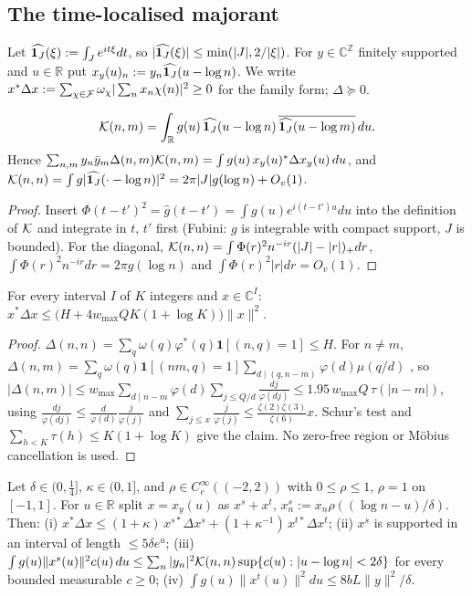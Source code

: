 \subsection{The time-localised majorant}\label{ssec:majorant}

Let $\widehat{\mathbf 1_J}(\xi):=\int_Je^{it\xi}dt$, so $|\widehat{\mathbf 1_J}(\xi)|\le\min(|J|,2/|\xi|)$. For $y\in\mathbb C^{\mathbb Z}$ finitely supported and $u\in\mathbb R$ put
$x_y(u)_n:=y_n\widehat{\mathbf 1_J}(u-\log n)$. We write $x^*\Delta x:=\sum_{\chi\in\mathcal{F}}\omega_\chi|\sum_nx_n\chi(n)|^2\ge0$ for the family form; $\Delta\succeq0$.

\begin{lemma}\label{lem:M1}
\[
 \mathcal{K}(n,m)=\int_{\mathbb R}g(u)\,\widehat{\mathbf 1_J}(u-\log n)\,\overline{\widehat{\mathbf 1_J}(u-\log m)}\,du .
\]
Hence
$\sum_{n,m}y_n\bar y_m\Delta(n,m)\mathcal{K}(n,m)=\int g(u)\,x_y(u)^*\Delta x_y(u)\,du$, and $\mathcal{K}(n,n)=\int g|\widehat{\mathbf 1_J}(\cdot-\log n)|^2=2\pi|J|g(\log n)+O_v(1)$.
\end{lemma}

\begin{proof}
Insert $\Phi(t-t')^2=\hat g(t-t')=\int g(u)e^{i(t-t')u}du$ into the definition of $\mathcal{K}$ and integrate in $t$, $t'$ first (Fubini: $g$ is
integrable with compact support, $J$ is bounded). For the diagonal, $\mathcal{K}(n,n)=\int\Phi(r)^2n^{-ir}(|J|-|r|)_+dr$,
$\int\Phi(r)^2n^{-ir}dr=2\pi g(\log n)$ and $\int\Phi(r)^2|r|dr=O_v(1)$.
\end{proof}

\begin{lemma}\label{lem:M2}
For every interval $I$ of $K$ integers and $x\in\mathbb C^I$: $x^*\Delta x\le\big(H+4w_{\max}QK(1+\log K)\big)\|x\|^2$.
\end{lemma}

\begin{proof}
$\Delta(n,n)=\sum_q\omega(q)\varphi^*(q)\mathbf 1[(n,q)=1]\le H$. For $n\ne m$, $\Delta(n,m)=\sum_q\omega(q)\mathbf 1[(nm,q)=1]\sum_{d\mid(q,n-m)}\varphi(d)\mu(q/d)$
\cite[(3.9)]{IK04}, so $|\Delta(n,m)|\le w_{\max}\sum_{d\mid n-m}\varphi(d)\sum_{j\le Q/d}\frac{dj}{\varphi(dj)}\le1.95\,w_{\max}Q\,\tau(|n-m|)$, using
$\frac{dj}{\varphi(dj)}\le\frac d{\varphi(d)}\frac j{\varphi(j)}$ and $\sum_{j\le x}\frac j{\varphi(j)}\le\frac{\zeta(2)\zeta(3)}{\zeta(6)}x$. Schur's test and
$\sum_{h<K}\tau(h)\le K(1+\log K)$ give the claim. No zero-free region or M\"obius cancellation is used.
\end{proof}

\begin{lemma}[M3: localisation]\label{lem:M3}
Let $\delta\in(0,\frac14]$, $\kappa\in(0,1]$, and $\rho\in C_c^\infty((-2,2))$ with $0\le\rho\le1$, $\rho=1$ on $[-1,1]$. For $u\in\mathbb R$ split
$x=x_y(u)$ as $x^s+x^t$, $x^s_n:=x_n\rho((\log n-u)/\delta)$. Then:
(i) $x^*\Delta x\le(1+\kappa)\,x^{s*}\Delta x^s+(1+\kappa^{-1})\,x^{t*}\Delta x^t$;
(ii) $x^s$ is supported in an interval of length $\le5\delta e^u$;
(iii) $\int g(u)\|x^s(u)\|^2c(u)\,du\le\sum_n|y_n|^2\mathcal{K}(n,n)\sup\{c(u):|u-\log n|<2\delta\}$ for every bounded measurable $c\ge0$;
(iv) $\int g(u)\|x^t(u)\|^2du\le8bL\|y\|^2/\delta$.
\end{lemma}

